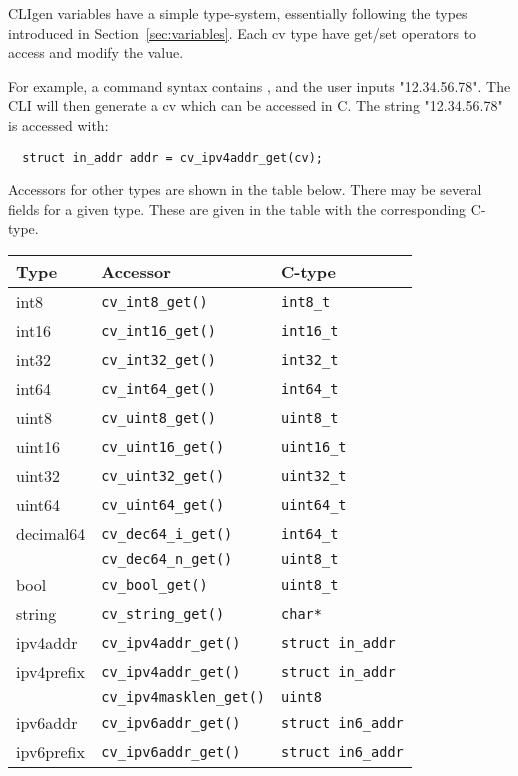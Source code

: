 \documentclass[a4paper, 10pt] {article}
\begin{document}
CLIgen variables have a simple type-system, essentially following the
types introduced in Section~\ref{sec:variables}. Each cv type
have get/set operators to access and modify the value.

For example, a command syntax contains {\tt <addr:ipv4addr>}, and
the user inputs "12.34.56.78". The CLI will then generate a cv which
can be accessed in C. The string
"12.34.56.78" is accessed with:
\begin{verbatim}
  struct in_addr addr = cv_ipv4addr_get(cv);
\end{verbatim}

Accessors for other types are shown in the table
below. There may be several fields for a given type. These are given
in the table with the corresponding C-type.

\begin{tabular}{ | l | l | l | }
\hline
  \textbf{ Type} & \textbf{Accessor} & \textbf{C-type}\\
\hline
int8   & {\tt cv\_int8\_get()}   & {\tt int8\_t} \\
int16  & {\tt cv\_int16\_get()}  & {\tt int16\_t} \\
int32  & {\tt cv\_int32\_get()}  & {\tt int32\_t} \\
int64  & {\tt cv\_int64\_get()}  & {\tt int64\_t} \\
uint8  & {\tt cv\_uint8\_get()}  & {\tt uint8\_t} \\
uint16 & {\tt cv\_uint16\_get()} & {\tt uint16\_t} \\
uint32 & {\tt cv\_uint32\_get()} & {\tt uint32\_t} \\
uint64 & {\tt cv\_uint64\_get()} & {\tt uint64\_t} \\
decimal64 & {\tt cv\_dec64\_i\_get()} & {\tt int64\_t}\\
           & {\tt cv\_dec64\_n\_get()} & {\tt uint8\_t}\\
bool & {\tt cv\_bool\_get()} & {\tt uint8\_t} \\
string & {\tt cv\_string\_get()} & {\tt char*} \\
ipv4addr   & {\tt cv\_ipv4addr\_get()} & {\tt struct in\_addr}\\
ipv4prefix & {\tt cv\_ipv4addr\_get()} & {\tt struct in\_addr}\\
           & {\tt cv\_ipv4masklen\_get()} & {\tt uint8}\\
ipv6addr   & {\tt cv\_ipv6addr\_get()} & {\tt struct in6\_addr}\\
ipv6prefix & {\tt cv\_ipv6addr\_get()} & {\tt struct in6\_addr}\\

\end{tabular}
\end{document}
